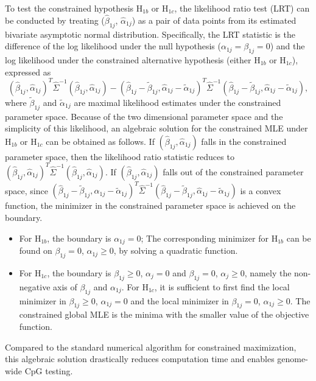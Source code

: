 \documentclass{statsoc}
\begin{document}
To test the constrained hypothesis $\mbox{H}_{1b}$ or $\mbox{H}_{1c}$, the likelihood ratio test (LRT) can be conducted by  treating ($\hat{\beta}_{1j}$, $\hat{\alpha}_{1j}$) as a pair of data points from its estimated bivariate asymptotic normal distribution. Specifically, the LRT statistic is the difference of the log likelihood under the null hypothesis ($\alpha_{1j}=\beta_{1j}=0$) and the log likelihood under the constrained alternative hypothesis (either $\mbox{H}_{1b}$ or $\mbox{H}_{1c}$), expressed as
\[
(\hat{\beta}_{1j}, \hat{\alpha}_{1j})^T\widehat{\Sigma}^{-1}(\hat{\beta}_{1j}, \hat{\alpha}_{1j}) - (\hat{\beta}_{1j} -\tilde{\beta}_{1j}, \hat{\alpha}_{1j}-\tilde{\alpha}_{1j})^T\widehat{\Sigma}^{-1}(\hat{\beta}_{1j}-\tilde{\beta}_{1j}, \hat{\alpha}_{1j}-\tilde{\alpha}_{1j}),
\]
where $\tilde{\beta}_{1j}$ and $\tilde{\alpha}_{1j}$ are maximal likelihood estimates under the constrained parameter space. Because of the two dimensional parameter space and the simplicity of this likelihood, an algebraic solution for the constrained MLE under H$_{1b}$ or H$_{1c}$ can be obtained as follows. If $(\hat{\beta}_{1j}, \hat{\alpha}_{1j})$ falls in the constrained parameter space, then the likelihood ratio statistic reduces to $(\hat{\beta}_{1j}, \hat{\alpha}_{1j})^T\widehat{\Sigma}^{-1}(\hat{\beta}_{1j}, \hat{\alpha}_{1j})$. If $(\hat{\beta}_{1j}, \hat{\alpha}_{1j})$ falls out of the constrained parameter space,  since $(\hat{\beta}_{1j} -\tilde{\beta}_{1j}, \hat{\alpha}_{1j}-\tilde{\alpha}_{1j})^T\widehat{\Sigma}^{-1}(\hat{\beta}_{1j}-\tilde{\beta}_{1j}, \hat{\alpha}_{1j}-\tilde{\alpha}_{1j})$ is a convex function, the minimizer in the constrained parameter space is achieved on the boundary.
\begin{itemize}
\item For H$_{1b}$, the boundary is $\alpha_{1j}= 0$; The corresponding minimizer for H$_{1b}$ can be found  on  $\beta_{1j}= 0$, $\alpha_{1j}\geq 0$, by solving a quadratic function.

\item For H$_{1c}$, the boundary is $\beta_{1j}\geq 0$, $\alpha_j =0$ and $\beta_{1j}= 0$, $\alpha_j \geq 0$, namely the non-negative axis of $\beta_{1j}$ and $\alpha_{1j}$. For H$_{1c}$, it is sufficient to first find the local minimizer in  $\beta_{1j}\geq 0$, $\alpha_{1j}= 0$ and the local minimizer in $\beta_{1j}= 0$, $\alpha_{1j}\geq 0$. The constrained global MLE is the minima with the smaller value of the objective function.
\end{itemize}
Compared to the standard numerical algorithm for constrained maximization, this algebraic solution drastically reduces computation time and enables genome-wide CpG testing.
\end{document}
